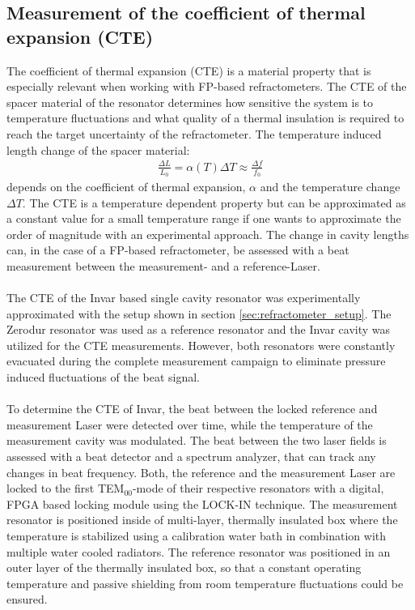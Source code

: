 \subsection{Measurement of the coefficient of thermal expansion (CTE)}
The coefficient of thermal expansion (CTE) is a material property that is especially relevant when working with FP-based refractometers. The CTE of the spacer material of the resonator determines how sensitive the system is to temperature fluctuations and what quality of a thermal insulation is required to reach the target uncertainty of the refractometer. The temperature induced length change of the spacer material:
\begin{align}
	\frac{\Delta L}{L_0} = \alpha(T) \Delta T \approx \frac{\Delta f}{f_0}
	\label{eq:CTE}
\end{align}
depends on the coefficient of thermal expansion, $\alpha$ and the temperature change $\Delta T$. The CTE is a temperature dependent property but can be approximated as a constant value for a small temperature range if one wants to approximate the order of magnitude with an experimental approach. The change in cavity lengths can, in the case of a FP-based refractometer, be assessed with a beat measurement between the measurement- and a reference-Laser. \\\\
The CTE of the Invar based single cavity resonator was experimentally approximated with the setup shown in section \ref{sec:refractometer_setup}. The Zerodur resonator was used as a reference resonator and the Invar cavity was utilized for the CTE measurements. However, both resonators were constantly evacuated during the complete measurement campaign to eliminate pressure induced fluctuations of the beat signal. \\\\
To determine the CTE of Invar, the beat between the locked reference and measurement Laser were detected over time, while the temperature of the measurement cavity was modulated. The beat between the two laser fields is assessed with a beat detector and a spectrum analyzer, that can track any changes in beat frequency. Both, the reference and the measurement Laser are locked to the first TEM$_{00}$-mode of their respective resonators with a digital, FPGA based locking module using the LOCK-IN technique. The measurement resonator is positioned inside of multi-layer, thermally insulated box where the temperature is stabilized using a calibration water bath in combination with multiple water cooled radiators. The reference resonator was positioned in an outer layer of the thermally insulated box, so that a constant operating temperature and passive shielding from room temperature fluctuations could be ensured. \\\\
